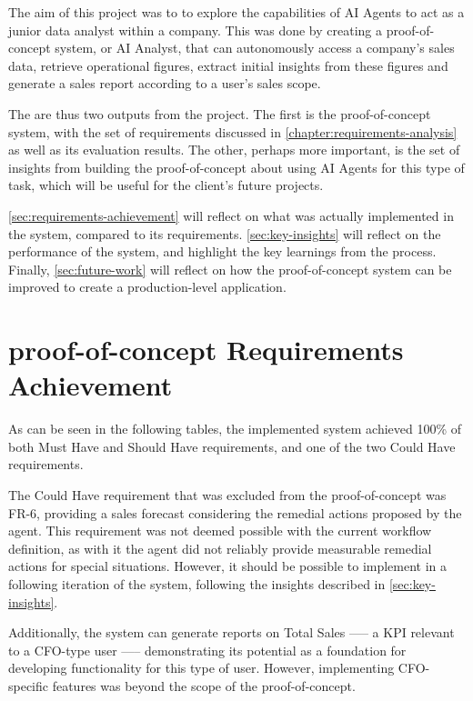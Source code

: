 \documentclass[a4paper]{report}
\begin{document}
The aim of this project was to to explore the capabilities of AI Agents to act as a junior data analyst within a company. This was done by creating a proof-of-concept system, or AI Analyst, that can autonomously access a company's sales data, retrieve operational figures, extract initial insights from these figures and generate a sales report according to a user's sales scope.

The are thus two outputs from the project. The first is the proof-of-concept system, with the set of requirements discussed in \autoref{chapter:requirements-analysis} as well as its evaluation results. The other, perhaps more important, is the set of insights from building the proof-of-concept about using AI Agents for this type of task, which will be useful for the client's future projects.

\autoref{sec:requirements-achievement} will reflect on what was actually implemented in the system, compared to its requirements. \autoref{sec:key-insights} will reflect on the performance of the system, and highlight the key learnings from the process. Finally, \autoref{sec:future-work} will reflect on how the proof-of-concept system can be improved to create a production-level application.

\section{proof-of-concept Requirements Achievement}
\label{sec:requirements-achievement}

As can be seen in the following tables, the implemented system achieved 100\% of both Must Have and Should Have requirements, and one of the two Could Have requirements.

The Could Have requirement that was excluded from the proof-of-concept was FR-6, providing a sales forecast considering the remedial actions proposed by the agent. This requirement was not deemed possible with the current workflow definition, as with it the agent did not reliably provide measurable remedial actions for special situations. However, it should be possible to implement in a following iteration of the system, following the insights described in \autoref{sec:key-insights}.

Additionally, the system can generate reports on Total Sales —-- a KPI relevant to a CFO-type user —-- demonstrating its potential as a foundation for developing functionality for this type of user. However, implementing CFO-specific features was beyond the scope of the proof-of-concept.
\end{document}
